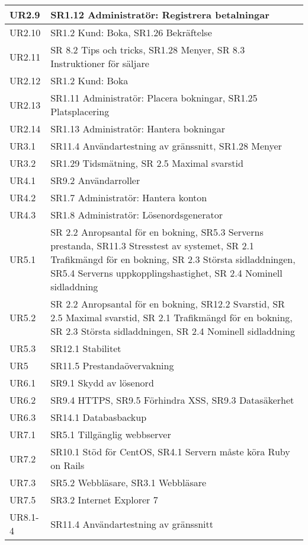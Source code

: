 \documentclass[a4paper, twoside, 11pt, titlepage]{article}
\begin{document}
\begin{tabular} { p{2.6cm} p{12.5cm} }
	\hline
	UR2.9 & SR1.12 Administratör: Registrera betalningar  \\
	\hline
	UR2.10 & SR1.2 Kund: Boka, SR1.26 Bekräftelse  \\
	\hline
	UR2.11 & SR 8.2 Tips och tricks, SR1.28 Menyer, SR 8.3 Instruktioner för säljare  \\
	\hline
	UR2.12 & SR1.2 Kund: Boka  \\
	\hline
	UR2.13 & SR1.11 Administratör: Placera bokningar, SR1.25 Platsplacering  \\
	\hline
	UR2.14 & SR1.13 Administratör: Hantera bokningar  \\
	\hline
	UR3.1 & SR11.4 Användartestning av gränssnitt, SR1.28 Menyer  \\
	\hline
	UR3.2 & SR1.29 Tidsmätning, SR 2.5 Maximal svarstid  \\
	\hline
	UR4.1 & SR9.2 Användarroller  \\
	\hline
	UR4.2 & SR1.7 Administratör: Hantera konton  \\
	\hline
	UR4.3 & SR1.8 Administratör: Lösenordsgenerator  \\
	\hline
	UR5.1 & SR 2.2 Anropsantal för en bokning, SR5.3 Serverns prestanda, SR11.3 Stresstest av systemet, SR 2.1 Trafikmängd för en bokning, SR 2.3 Största sidladdningen, SR5.4 Serverns uppkopplingshastighet, SR 2.4 Nominell sidladdning  \\
	\hline
	UR5.2 & SR 2.2 Anropsantal för en bokning, SR12.2 Svarstid, SR 2.5 Maximal svarstid, SR 2.1 Trafikmängd för en bokning, SR 2.3 Största sidladdningen, SR 2.4 Nominell sidladdning  \\
	\hline
	UR5.3 & SR12.1 Stabilitet  \\
	\hline
	UR5 & SR11.5 Prestandaövervakning  \\
	\hline
	UR6.1 & SR9.1 Skydd av lösenord  \\
	\hline
	UR6.2 & SR9.4 HTTPS, SR9.5 Förhindra XSS, SR9.3 Datasäkerhet  \\
	\hline
	UR6.3 & SR14.1 Databasbackup  \\
	\hline
	UR7.1 & SR5.1 Tillgänglig webbserver  \\
	\hline
	UR7.2 & SR10.1 Stöd för CentOS, SR4.1 Servern måste köra Ruby on Rails  \\
	\hline
	UR7.3 & SR5.2 Webbläsare, SR3.1 Webbläsare  \\
	\hline
	UR7.5 & SR3.2 Internet Explorer 7  \\
	\hline
	UR8.1-4 & SR11.4 Användartestning av gränssnitt  \\

\end{tabular}
\end{document}
